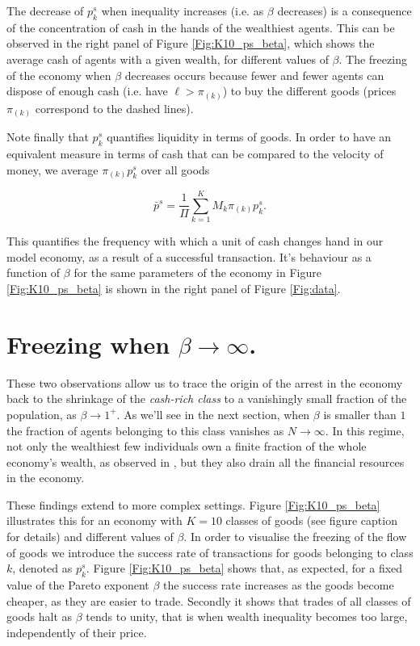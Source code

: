 The decrease of $p^s_k$ when inequality increases (i.e. as $\beta$ decreases) is a consequence of the concentration of cash in the hands of the wealthiest agents. This can be observed in the right panel of  Figure \ref{Fig:K10_ps_beta}, which shows the average cash of agents with a given wealth, for different values of $\beta$. The freezing of the economy when $\beta$ decreases occurs because fewer and fewer agents can dispose of enough cash (i.e. have $\ell > \pi_{(k)}$) to buy the different goods (prices $\pi_{(k)}$ correspond to the dashed lines). 

Note finally that $p^s_k$ quantifies liquidity in terms of goods. In order to have an equivalent measure in terms of cash that can be compared to the velocity of money, we average $\pi_{(k)} p^s_k$ over all goods

\begin{equation}
\label{def:pavg}
\bar p^s=\frac{1}{\Pi}\sum_{k=1}^K M_k \pi_{(k)} p^s_k.
\end{equation}

This quantifies the frequency with which a unit of cash changes hand in our model economy, as a result of a successful transaction. It's behaviour as a function of $\beta$ for the same parameters of the economy in Figure \ref{Fig:K10_ps_beta} is shown in the right panel of Figure \ref{Fig:data}.



\section{Freezing when $\beta \to \infty$.}

 
These two observations allow us to trace the origin of the arrest in the economy back to the shrinkage of the \textit{cash-rich class} to a vanishingly small fraction of the population, as $\beta \to 1^{+}$. As we'll see in the next section, when $\beta$ is smaller than $1$ the fraction of agents belonging to this class vanishes as $N \to \infty$. In this regime, not only the wealthiest few individuals own a finite fraction of the whole economy's wealth, as observed in \cite{bouchaud2000wealth}, but they also drain all the financial resources in the economy.

These findings extend to more complex settings. Figure \ref{Fig:K10_ps_beta} illustrates this for an economy with $K=10$ classes of goods (see figure caption for details) and different values of $\beta$. In order to visualise the freezing of the flow of goods we introduce the success rate of transactions for goods belonging to class $k$, denoted as $p^s_{k}$.  Figure \ref{Fig:K10_ps_beta} shows that, as expected, for a fixed value of the Pareto exponent $\beta$ the success rate increases as the  goods become cheaper, as they are easier to trade.  Secondly it shows that trades of all classes of goods halt as $\beta$ tends to unity, that is when wealth inequality becomes too large, independently of their price.

